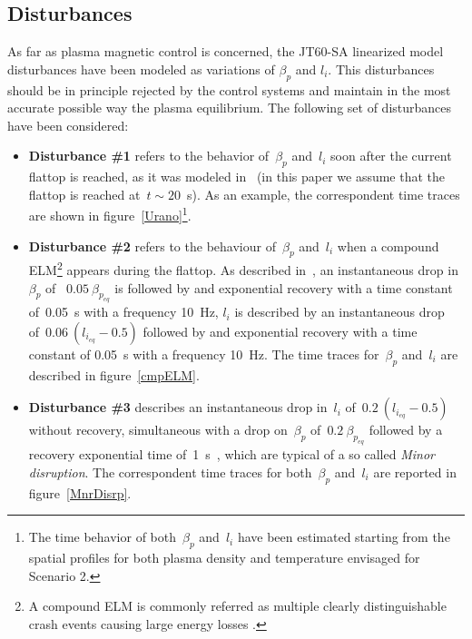 \subsection{Disturbances}


As far as plasma magnetic control is concerned, the JT60-SA linearized model disturbances have been modeled as variations of $\beta_p$ and $l_i$. This disturbances should be in principle rejected by the control systems and maintain in the most accurate possible way the plasma equilibrium.  The following set of disturbances have been considered: 

\begin{itemize}
	\item \textbf{Disturbance \#1} refers to the behavior of~$\beta_p$ and~$l_i$ soon after the current flattop is reached, as it was modeled in~\cite{urano2015development} (in this paper we assume that the flattop is reached at~$t\sim 20$~s). As an example, the correspondent time traces are shown in figure~\ref{Urano}\footnote{The time behavior of both~$\beta_p$ and~$l_i$ have been estimated starting from the spatial profiles for both plasma density and temperature envisaged for Scenario 2.}.
	
	


	
	\item \textbf{Disturbance \#2} refers to the behaviour of~$\beta_p$ and~$l_i$ when a compound ELM\footnote{A compound ELM is commonly referred as multiple clearly distinguishable
	crash events causing large energy losses \cite{Meyer2017}.} appears during the flattop.  As described in~\cite[p.~34]{JT60SA:PID}, an instantaneous drop   in~$\beta_p$ of ~$0.05~\beta_{p_{eq}}$ is followed by and exponential recovery with a time constant of~0.05~s with a frequency 10~Hz, $l_i$ is described by an instantaneous drop of~$0.06~(l_{i_{eq}}-0.5)$ followed by and exponential recovery with a time constant of 0.05~s with a frequency 10~Hz. The time traces for~$\beta_p$ and~$l_i$ are described in figure~\ref{cmpELM}.
	


	
	\item \textbf{Disturbance \#3} describes an instantaneous drop in~$l_i$ of~$0.2~(l_{i_{eq}}-0.5)$ without recovery, simultaneous with a drop on~$\beta_p$ of~$0.2~\beta_{p_{eq}}$ followed by a recovery exponential time of~1~s~\cite[p.~34]{JT60SA:PID}, which are typical of a so called \emph{Minor disruption}. The correspondent time traces for both~$\beta_p$ and~$l_i$ are reported in figure~\ref{MnrDisrp}.
\end{itemize}


